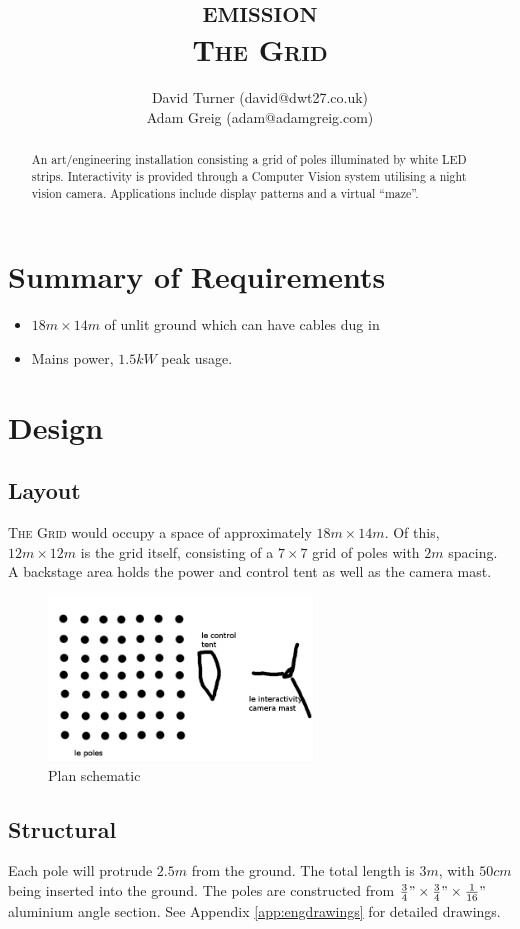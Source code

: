\documentclass[12pt]{article} %
\title {\textsc{emission}\\\large{\textsc{The Grid}}}
\author{David Turner (david@dwt27.co.uk)\\Adam Greig (adam@adamgreig.com)}
\begin{document}
    \maketitle

\begin{abstract}
An art/engineering installation consisting a grid of poles illuminated by white LED strips.  Interactivity is provided through a Computer Vision system utilising a night vision camera.  Applications include display patterns and a virtual ``maze''.
\end{abstract}

\section{Summary of Requirements}
\begin{itemize}
    \item $18m \times 14m$ of unlit ground which can have cables dug in
    \item Mains power, $1.5kW$ peak usage.
\end{itemize}

\section{Design}
\subsection{Layout}
\textsc{The Grid} would occupy a space of approximately $18m \times 14m$.  Of this, $12m \times 12m$ is the grid itself, consisting of a $7 \times 7$ grid of poles with $2m$ spacing.  A backstage area holds the power and control tent as well as the camera mast.

\begin{figure}[h]
    \centering
    \includegraphics[width=7cm]{diags/plan.png}
    \caption{Plan schematic}
    \label{fig:planschematic}
\end{figure}

\subsection{Structural}
Each pole will protrude $2.5m$ from the ground.  The total length is $3m$, with $50cm$ being inserted into the ground.  The poles are constructed from $\frac{3}{4}" \times \frac{3}{4}" \times \frac{1}{16}"$ aluminium angle section.  See Appendix \ref{app:engdrawings} for detailed drawings.
\end{document}
